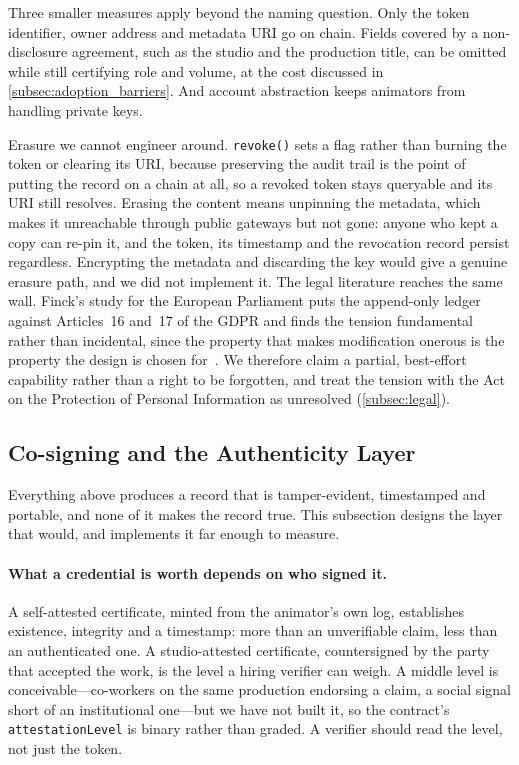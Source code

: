 Three smaller measures apply beyond the naming question. Only the token identifier,
owner address and metadata URI go on chain. Fields covered by a non-disclosure
agreement, such as the studio and the production title, can be omitted while still
certifying role and volume, at the cost discussed in \cref{subsec:adoption_barriers}.
And account abstraction keeps animators from handling private keys.

Erasure we cannot engineer around. \texttt{revoke()} sets a flag rather than burning
the token or clearing its URI, because preserving the audit trail is the point of
putting the record on a chain at all, so a revoked token stays queryable and its URI
still resolves. Erasing the content means unpinning the metadata, which makes it
unreachable through public gateways but not gone: anyone who kept a copy can re-pin it,
and the token, its timestamp and the revocation record persist regardless. Encrypting
the metadata and discarding the key would give a genuine erasure path, and we did not
implement it. The legal literature reaches the same wall. Finck's study for the European
Parliament puts the append-only ledger against Articles~16 and~17 of the GDPR and finds
the tension fundamental rather than incidental, since the property that makes
modification onerous is the property the design is chosen for~\cite{finck2019stoa}. We
therefore claim a partial, best-effort capability rather than a right to be forgotten,
and treat the tension with the Act on the Protection of Personal Information as
unresolved (\cref{subsec:legal}).

\subsection{Co-signing and the Authenticity Layer}
\label{subsec:cosigning}

Everything above produces a record that is tamper-evident, timestamped and
portable, and none of it makes the record true. This subsection designs the layer
that would, and implements it far enough to measure.

\paragraph{What a credential is worth depends on who signed it.}
A self-attested certificate, minted from the animator's own log, establishes existence,
integrity and a timestamp: more than an unverifiable claim, less than an authenticated
one. A studio-attested certificate, countersigned by the party that accepted the work,
is the level a hiring verifier can weigh. A middle level is conceivable---co-workers on
the same production endorsing a claim, a social signal short of an institutional
one---but we have not built it, so the contract's \texttt{attestationLevel} is binary
rather than graded. A verifier should read the level, not just the token.

